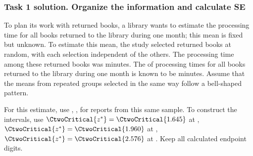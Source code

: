 \subsubsection*{Task 1 solution. Organize the information and calculate SE}
\label{sol:c2-compare-three-a}
To plan its work with returned books, a library wants to estimate the  processing time for all books returned to the library during one month; this mean is fixed but unknown. To estimate this mean, the study selected  returned books at random, with each selection independent of the others. The  processing time among these  returned books was  minutes. The  of processing times for all books returned to the library during one month is known to be  minutes. Assume that the means from repeated groups selected in the same way follow a bell-shaped pattern.

For this estimate, use , ,   for reports from this same sample. To construct the intervals, use $\CtwoCritical{z^*}=\CtwoCritical{1.645}$ at , $\CtwoCritical{z^*}=\CtwoCritical{1.960}$ at , $\CtwoCritical{z^*}=\CtwoCritical{2.576}$ at . Keep all calculated endpoint digits.

